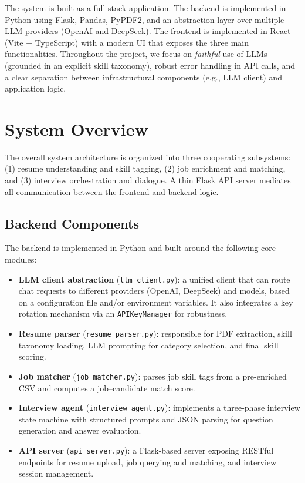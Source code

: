 \documentclass[11pt,a4paper]{article}
\begin{document}
The system is built as a full-stack application. The backend is implemented in Python using Flask, Pandas, PyPDF2, and an abstraction layer over multiple LLM providers (OpenAI and DeepSeek). The frontend is implemented in React (Vite + TypeScript) with a modern UI that exposes the three main functionalities. Throughout the project, we focus on \emph{faithful} use of LLMs (grounded in an explicit skill taxonomy), robust error handling in API calls, and a clear separation between infrastructural components (e.g., LLM client) and application logic.

\section{System Overview}

The overall system architecture is organized into three cooperating subsystems: (1) resume understanding and skill tagging, (2) job enrichment and matching, and (3) interview orchestration and dialogue. A thin Flask API server mediates all communication between the frontend and backend logic.

\subsection{Backend Components}

The backend is implemented in Python and built around the following core modules:

\begin{itemize}
    \item \textbf{LLM client abstraction} (\texttt{llm\_client.py}): a unified client that can route chat requests to different providers (OpenAI, DeepSeek) and models, based on a configuration file and/or environment variables. It also integrates a key rotation mechanism via an \texttt{APIKeyManager} for robustness.
    \item \textbf{Resume parser} (\texttt{resume\_parser.py}): responsible for PDF extraction, skill taxonomy loading, LLM prompting for category selection, and final skill scoring.
    \item \textbf{Job matcher} (\texttt{job\_matcher.py}): parses job skill tags from a pre-enriched CSV and computes a job--candidate match score.
    \item \textbf{Interview agent} (\texttt{interview\_agent.py}): implements a three-phase interview state machine with structured prompts and JSON parsing for question generation and answer evaluation.
    \item \textbf{API server} (\texttt{api\_server.py}): a Flask-based server exposing RESTful endpoints for resume upload, job querying and matching, and interview session management.
\end{itemize}
\end{document}
